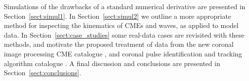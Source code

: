 \documentclass[structabstract]{aa}
\begin{document}
Simulations of the drawbacks of a standard numerical derivative are presented in Section~\ref{sect:simul1}. In Section~\ref{sect:simul2} we outline a more appropriate method for inspecting the  kinematics of CMEs and waves, as applied to model data. In Section~\ref{sect:case_studies} some real-data cases are revisited with these methods, and motivate the proposed treatment of data from the new coronal image processing CME catalogue \citep[CORIMP;][]{2012ApJ...752..144M, 2012ApJ...752..145B}, and coronal pulse identification and tracking algorithm catalogue \citep[CorPITA;][]{2011A&A...531A..42L}. A final discussion and conclusions are presented in Section~\ref{sect:conclusions}.


\begin{figure}
\centering
{}

\end{figure}
\end{document}
